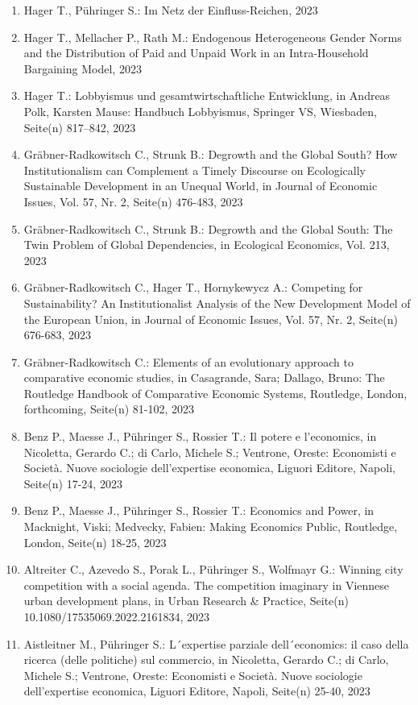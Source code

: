 \begin{enumerate}
	 \item Hager T., Pühringer S.: Im Netz der Einfluss-Reichen, 2023
	 \item Hager T., Mellacher P., Rath M.: Endogenous Heterogeneous Gender Norms and the Distribution of Paid and Unpaid Work in an Intra-Household Bargaining Model, 2023
	 \item Hager T.: Lobbyismus und gesamtwirtschaftliche Entwicklung, in Andreas Polk, Karsten Mause: Handbuch Lobbyismus, Springer VS, Wiesbaden, Seite(n) 817–842, 2023
	 \item Gräbner-Radkowitsch C., Strunk B.: Degrowth and the Global South? How Institutionalism can Complement a Timely Discourse on Ecologically Sustainable Development in an Unequal World, in Journal of Economic Issues, Vol. 57, Nr. 2, Seite(n) 476-483, 2023
	 \item Gräbner-Radkowitsch C., Strunk B.: Degrowth and the Global South: The Twin Problem of Global Dependencies, in Ecological Economics, Vol. 213, 2023
	 \item Gräbner-Radkowitsch C., Hager T., Hornykewycz A.: Competing for Sustainability? An Institutionalist Analysis of the New Development Model of the European Union, in Journal of Economic Issues, Vol. 57, Nr. 2, Seite(n) 676-683, 2023
	 \item Gräbner-Radkowitsch C.: Elements of an evolutionary approach to comparative economic studies, in Casagrande, Sara; Dallago, Bruno: The Routledge Handbook of Comparative Economic Systems, Routledge, London, forthcoming, Seite(n) 81-102, 2023
	 \item Benz P., Maesse J., Pühringer S., Rossier T.: Il potere e l'economics, in Nicoletta, Gerardo C.; di Carlo, Michele S.; Ventrone, Oreste: Economisti e Società. Nuove sociologie dell'expertise economica, Liguori Editore, Napoli, Seite(n) 17-24, 2023
	 \item Benz P., Maesse J., Pühringer S., Rossier T.: Economics and Power, in Macknight, Viski; Medvecky, Fabien: Making Economics Public, Routledge, London, Seite(n) 18-25, 2023
	 \item Altreiter C., Azevedo S., Porak L., Pühringer S., Wolfmayr G.: Winning city competition with a social agenda. The competition imaginary in Viennese urban development plans, in Urban Research & Practice, Seite(n) 10.1080/17535069.2022.2161834, 2023
	 \item Aistleitner M., Pühringer S.: L´expertise parziale dell´economics: il caso della ricerca (delle politiche) sul commercio, in Nicoletta, Gerardo C.; di Carlo, Michele S.; Ventrone, Oreste: Economisti e Società. Nuove sociologie dell'expertise economica, Liguori Editore, Napoli, Seite(n) 25-40, 2023

\end{enumerate}
